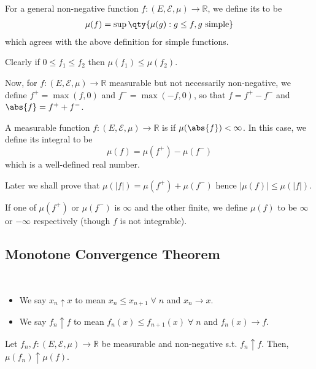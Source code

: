 \begin{definition}[$\mu$-integral]
	For a general non-negative function $f \colon (E,\mathcal E,\mu) \to \mathbb R$, we define its  to be
	\begin{align*}
		\mu(f) = \sup\qty{\mu(g) : g \leq f, g \text{ simple}}
	\end{align*}
	which agrees with the above definition for simple functions.
\end{definition}

Clearly if $0 \leq f_1 \leq f_2$ then $\mu(f_1) \leq \mu(f_2)$.

Now, for $f \colon (E,\mathcal E,\mu) \to \mathbb R$ measurable but not necessarily non-negative, we define $f^+ = \max(f,0)$ and $f^- = \max(-f,0)$, so that $f = f^+ - f^-$ and $\abs{f} = f^+ + f^-$.
\begin{definition}[$\mu$-integrable]
	A measurable function $f \colon (E,\mathcal E,\mu) \to \mathbb R$ is  if $\mu(\abs{f}) < \infty$.
	In this case, we define its integral to be
	\[ \mu(f) = \mu(f^+) - \mu(f^-) \]
	which is a well-defined real number.
\end{definition}
Later we shall prove that $\mu(|f|) = \mu(f^+) + \mu(f^-)$ hence $|\mu(f)| \leq \mu(|f|)$.

If one of $\mu(f^+)$ or $\mu(f^-)$ is $\infty$ and the other finite, we define $\mu(f)$ to be $\infty$ or $-\infty$ respectively (though $f$ is not integrable).

\subsection{Monotone Convergence Theorem}
\begin{notation} \
	\begin{itemize}
		\item 	We say $x_n \uparrow x$ to mean $x_n \leq x_{n+1} \; \forall \; n$ and $x_n \to x$.
		\item 	We say $f_n \uparrow f$ to mean $f_n(x) \leq f_{n+1}(x) \; \forall \; n$ and $f_n(x) \to f$.
	\end{itemize}
\end{notation}

\begin{theorem} \label{thm:mct}
	Let $f_n, f \colon (E,\mathcal E,\mu) \to \mathbb R$ be measurable and non-negative s.t. $f_n \uparrow f$.
	Then, $\mu(f_n) \uparrow \mu(f)$.
\end{theorem}

